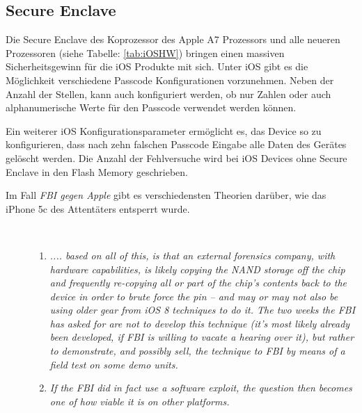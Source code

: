 \subsection{Secure Enclave}
\label{sec:Frage1SecureEnclave}
 
 Die Secure Enclave des Koprozessor des Apple A7 Prozessors und alle neueren Prozessoren (siehe Tabelle: \ref{tab:iOSHW}) bringen einen massiven Sicherheitsgewinn für die iOS Produkte mit sich. Unter iOS gibt es die Möglichkeit verschiedene Passcode Konfigurationen vorzunehmen. Neben der Anzahl der Stellen, kann auch konfiguriert werden, ob nur Zahlen oder auch alphanumerische Werte für den Passcode verwendet werden können.\par 
 Ein weiterer iOS Konfigurationsparameter ermöglicht es, das Device so zu konfigurieren, dass nach zehn falschen Passcode Eingabe alle Daten des Gerätes gelöscht werden. Die Anzahl der Fehlversuche wird bei iOS Devices ohne Secure Enclave in den Flash Memory geschrieben. \par
 Im Fall \textit{\glqq FBI gegen Apple\grqq{}} gibt es verschiedensten Theorien darüber, wie das iPhone 5c des Attentäters entsperrt wurde. 
 \begin{description}
    \item[\parbox{\textwidth} {Der Sicherheitsforscher Zdziarski beschreibt in seinen Abhandlungen die unterschiedlichen Möglichkeiten wie folgt:}]~\par
    \begin{enumerate}
       \item \textit{\glqq .... based on all of this, is that an external forensics company, with hardware capabilities, is likely copying the NAND storage off the chip and frequently re-copying all or part of the chip’s contents back to the device in order to brute force the pin – and may or may not also be using older gear from iOS 8 techniques to do it. The two weeks the FBI has asked for are not to develop this technique (it’s most likely already been developed, if FBI is willing to vacate a hearing over it), but rather to demonstrate, and possibly sell, the technique to FBI by means of a field test on some demo units.\grqq{}} \cite{Hacking[4]}
       \item \textit{\glqq If the FBI did in fact use a software exploit, the question then becomes one of how viable it is on other platforms.\grqq{}} \cite{Hacking[4]}
   \end{enumerate}
\end{description} 

